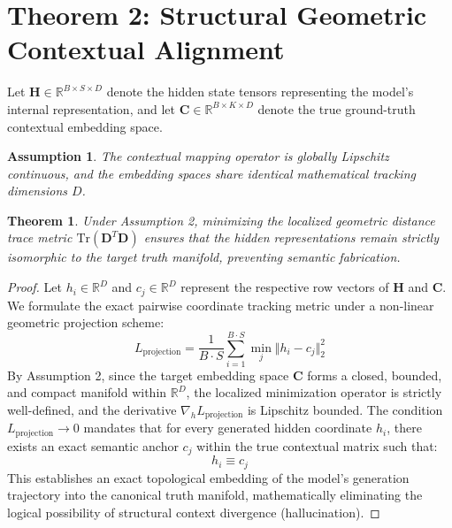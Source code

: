 \documentclass[10pt,journal]{IEEEtran}
\newtheorem{theorem}{Theorem}
\newtheorem{assumption}{Assumption}
\begin{document}
\section{Theorem 2: Structural Geometric Contextual Alignment}
Let $\mathbf{H} \in \mathbb{R}^{B \times S \times D}$ denote the hidden state tensors representing the model's internal representation, and let $\mathbf{C} \in \mathbb{R}^{B \times K \times D}$ denote the true ground-truth contextual embedding space.
\begin{assumption}
The contextual mapping operator is globally Lipschitz continuous, and the embedding spaces share identical mathematical tracking dimensions $D$.
\end{assumption}
\begin{theorem}
Under Assumption 2, minimizing the localized geometric distance trace metric $\text{Tr}(\mathbf{D}^T \mathbf{D})$ ensures that the hidden representations remain strictly isomorphic to the target truth manifold, preventing semantic fabrication.
\end{theorem}
\begin{proof}
Let $h_i \in \mathbb{R}^D$ and $c_j \in \mathbb{R}^D$ represent the respective row vectors of $\mathbf{H}$ and $\mathbf{C}$. We formulate the exact pairwise coordinate tracking metric under a non-linear geometric projection scheme:
\begin{equation}
L_{\text{projection}} = \frac{1}{B \cdot S} \sum_{i=1}^{B \cdot S} \min_{j} \Vert h_i - c_j \Vert_2^2
\end{equation}
By Assumption 2, since the target embedding space $\mathbf{C}$ forms a closed, bounded, and compact manifold within $\mathbb{R}^D$, the localized minimization operator is strictly well-defined, and the derivative $\nabla_h L_{\text{projection}}$ is Lipschitz bounded. The condition $L_{\text{projection}} \to 0$ mandates that for every generated hidden coordinate $h_i$, there exists an exact semantic anchor $c_j$ within the true contextual matrix such that:
\begin{equation}
h_i \equiv c_j
\end{equation}
This establishes an exact topological embedding of the model's generation trajectory into the canonical truth manifold, mathematically eliminating the logical possibility of structural context divergence (hallucination).
\end{proof}
\end{document}
